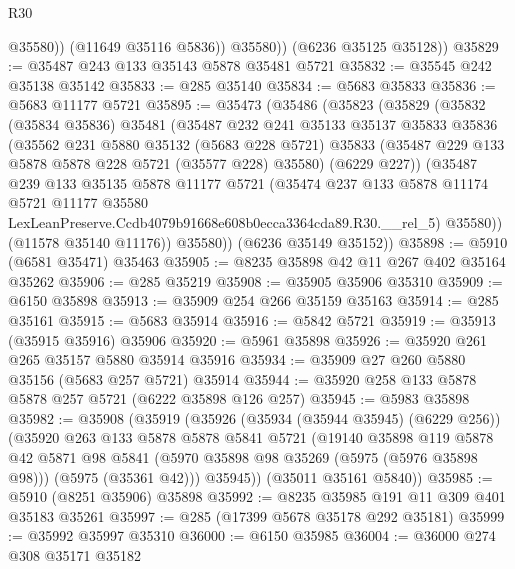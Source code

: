 \begin{lexlean}{R30}
\begin{coremodule}
                @35580))
            (@11649 @35116 @5836))
          @35580))
      (@6236 @35125 @35128))
@35829 := @35487 @243 @133 @35143 @5878 @35481 @5721
@35832 := @35545 @242 @35138 @35142
@35833 := @285 @35140
@35834 := @5683 @35833
@35836 := @5683 @11177 @5721
@35895 := @35473
    (@35486
      (@35823
        (@35829
          (@35832
            (@35834 @35836)
            @35481
            (@35487
              @232
              @241
              @35133
              @35137
              @35833
              @35836
              (@35562
                @231
                @5880
                @35132
                (@5683 @228 @5721)
                @35833
                (@35487 @229 @133 @5878 @5878 @228 @5721 (@35577 @228) @35580)
                (@6229 @227))
              (@35487
                @239
                @133
                @35135
                @5878
                @11177
                @5721
                (@35474
                  @237
                  @133
                  @5878
                  @11174
                  @5721
                  @11177
                  @35580
                  LexLeanPreserve.Ccdb4079b91668e608b0ecca3364cda89.R30.__rel_5)
                @35580))
            (@11578 @35140 @11176))
          @35580))
      (@6236 @35149 @35152))
@35898 := @5910 (@6581 @35471) @35463
@35905 := @8235 @35898 @42 @11 @267 @402 @35164 @35262
@35906 := @285 @35219
@35908 := @35905 @35906 @35310
@35909 := @6150 @35898
@35913 := @35909 @254 @266 @35159 @35163
@35914 := @285 @35161
@35915 := @5683 @35914
@35916 := @5842 @5721
@35919 := @35913 (@35915 @35916) @35906
@35920 := @5961 @35898
@35926 := @35920 @261 @265 @35157 @5880 @35914 @35916
@35934 := @35909 @27 @260 @5880 @35156 (@5683 @257 @5721) @35914
@35944 := @35920 @258 @133 @5878 @5878 @257 @5721 (@6222 @35898 @126 @257)
@35945 := @5983 @35898
@35982 := @35908
    (@35919
      (@35926
        (@35934 (@35944 @35945) (@6229 @256))
        (@35920
          @263
          @133
          @5878
          @5878
          @5841
          @5721
          (@19140
            @35898
            @119
            @5878
            @42
            @5871
            @98
            @5841
            (@5970 @35898 @98 @35269 (@5975 (@5976 @35898 @98)))
            (@5975 (@35361 @42)))
          @35945))
      (@35011 @35161 @5840))
@35985 := @5910 (@8251 @35906) @35898
@35992 := @8235 @35985 @191 @11 @309 @401 @35183 @35261
@35997 := @285 (@17399 @5678 @35178 @292 @35181)
@35999 := @35992 @35997 @35310
@36000 := @6150 @35985
@36004 := @36000 @274 @308 @35171 @35182

\end{coremodule}
\end{lexlean}
